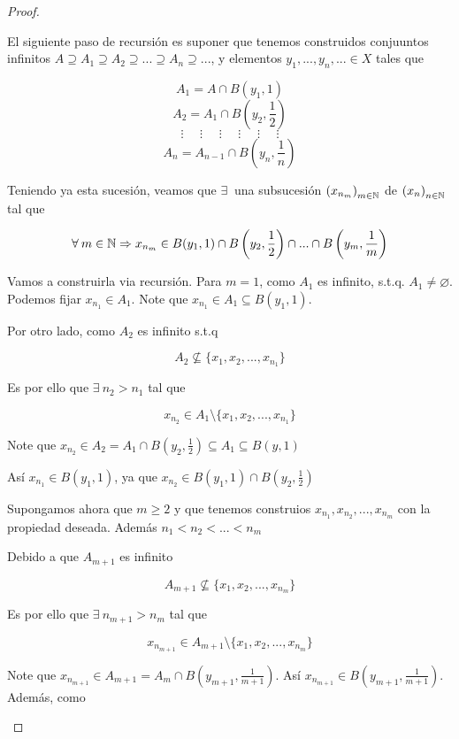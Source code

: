 \begin{proof}
\begin{enumerate}
        El siguiente paso de recursión es suponer que tenemos construidos conjuuntos infinitos $A \supseteq A_1 \supseteq A_2 \supseteq ... \supseteq A_n \supseteq ...$, y elementos $y_1, ..., y_n, ... \in X$ tales que 

        $$ A_1 =  A \cap B(y_1, 1)   $$
        $$ A_2 = A_1 \cap  B\left( y_2, \frac{1}{2} \right) $$
        $$\vdots \: \: \: \: \: \:\vdots \: \: \: \: \: \:\vdots \: \: \: \: \: \:\vdots \: \: \: \: \: \:\vdots \: \: \: \: \: \:\vdots$$
        $$ A_n = A_{n-1} \cap  B\left( y_n, \frac{1}{n} \right) $$

        Teniendo ya esta sucesión, veamos que $\exists \: $ una subsucesión $ {\left( x_{n_m}\right)}_{m \in \mathbb{N}}$ de $ {\left( x_{n}\right)}_{n \in \mathbb{N}}$ tal que

        $$\forall \: m \in \mathbb{N} \Rightarrow x_{n_m} \in B(y_1, 1) \cap B\left( y_2, \frac{1}{2} \right) \cap  ... \cap B\left( y_m, \frac{1}{m} \right)$$

        Vamos a construirla via recursión. Para $m =1$, como $A_1$ es infinito, s.t.q. $A_1 \neq \varnothing$. Podemos fijar $x_{n_1} \in A_1$. Note que $x_{n_1} \in A_1 \subseteq B(y_1, 1)$. 
        
        Por otro lado, como $A_2$ es infinito s.t.q

        $$A_2 \nsubseteq \{ x_1, x_2, ..., x_{n_1} \}$$

        Es por ello que $\exists \: n_2 > n_1$ tal que 

        $$x_{n_2} \in A_1 \setminus \{ x_1, x_2, ..., x_{n_1} \} $$

        Note que $x_{n_2} \in A_2 = A_1 \cap  B\left( y_2, \frac{1}{2} \right) \subseteq A_1 \subseteq B(y,1)$

        Así $x_{n_1}  \in B(y_1, 1)$, ya que $x_{n_2} \in B(y_1, 1 ) \cap B \left( y_2, \frac{1}{2} \right)$

        Supongamos ahora que $m \geqslant 2$ y que tenemos construios $x_{n_1}  , x_{n_2}, ..., x_{n_m}$ con la propiedad deseada. Además $n_1 < n_2 < ... < n_m$

        Debido a que $A_{m+1}$ es infinito

        $$A_{m+1} \nsubseteq \{ x_1, x_2, ..., x_{n_m} \}$$

        Es por ello que $\exists \: n_{m+1} > n_m$ tal que 

        $$x_{n_{m+1}} \in A_{m+1} \setminus \{ x_1, x_2, ..., x_{n_m} \} $$

        Note que $x_{n_{m+1}} \in  A_{m+1} = A_m \cap B\left( y_{m+1}, \frac{1}{m+1} \right)$. Así $x_{n_{m+1}} \in  B\left( y_{m+1}, \frac{1}{m+1} \right)$. Además, como 


\end{enumerate}
\end{proof}
